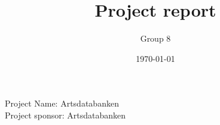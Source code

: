 \documentclass[a4paper]{article}
\begin{document}
	\title{Project report}
	\author{Group 8}
	\date{\today}
	\maketitle
	\pagebreak
	\begin{center}
		Project Name: Artsdatabanken \\
		Project sponsor: Artsdatabanken
	\end{center}
	\newpage

	\tableofcontents
	\listoffigures
	\listoftables

	\newpage
	

	\newpage
	

	\newpage
	

	\newpage
	

	\newpage
	

	\newpage
	

    \newpage
    


%	

	\nocite{*}
	
	
\end{document}
